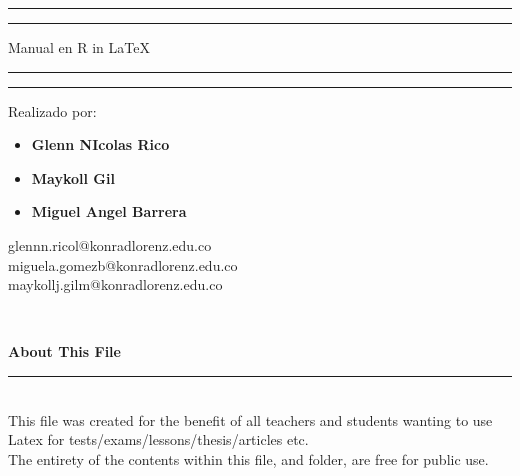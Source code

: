 \documentclass[12pt,hidelinks]{article}
\begin{document}
\begin{titlepage}
	\centering %
	\scshape %
	\vspace*{1.5\baselineskip} %

	\rule{13cm}{1.6pt}\vspace*{-\baselineskip}\vspace*{2pt} %
	\rule{13cm}{0.4pt} %
	
		\vspace{0.75\baselineskip} %
	{	\Huge Manual en R in \LaTeX \\	}
		\vspace{0.75\baselineskip} %
	\rule{13cm}{0.4pt}\vspace*{-\baselineskip}\vspace{3.2pt} %
	\rule{13cm}{1.6pt} %
	
		\vspace{1.75\baselineskip} %
	{\large Realizado por: \begin{itemize}
	    \item \textbf{Glenn NIcolas Rico} 
	    \item \textbf{Maykoll Gil}
	    \item \textbf{Miguel Angel Barrera }
	\end{itemize}
		\vspace*{1.2\baselineskip}
	glennn.ricol@konradlorenz.edu.co \vspace{2mm}\\
	miguela.gomezb@konradlorenz.edu.co \vspace{2mm}\\
	maykollj.gilm@konradlorenz.edu.co} \\
	\vfill

\end{titlepage}
\tableofcontents
\vfill
\small{\noindent \textbf{About This File} \vspace{-3mm}\\
\noindent \rule{3.3cm}{0.5pt} \\
This file was created for the benefit of all teachers and students wanting to use Latex for tests/exams/lessons/thesis/articles etc.\\
The entirety of the contents within this file, and folder, are free for public use.}
\newpage
{}
\end{document}
